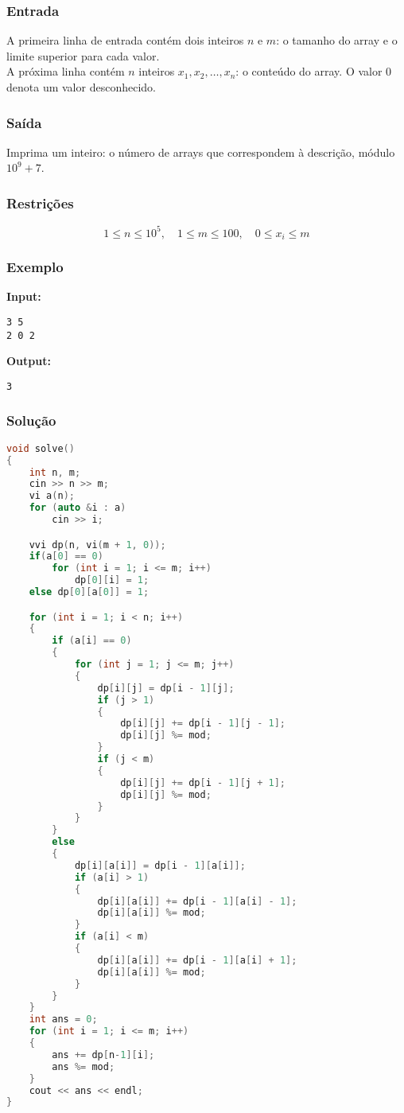 \subsubsection*{Entrada}
A primeira linha de entrada contém dois inteiros \( n \) e \( m \): o tamanho do array e o limite superior para cada valor.\\
A próxima linha contém \( n \) inteiros \( x_1, x_2, \dots, x_n \): o conteúdo do array. O valor \( 0 \) denota um valor desconhecido.

\subsubsection*{Saída}
Imprima um inteiro: o número de arrays que correspondem à descrição, módulo \( 10^9+7 \).

\subsubsection*{Restrições}
\[
1 \le n \le 10^5,\quad 1 \le m \le 100,\quad 0 \le x_i \le m
\]

\subsubsection*{Exemplo}

\textbf{Input:}
\begin{verbatim}
3 5
2 0 2
\end{verbatim}

\textbf{Output:}
\begin{verbatim}
3
\end{verbatim}

\subsubsection*{Solução}
\begin{lstlisting}[language=C++]
void solve()
{
    int n, m;
    cin >> n >> m;
    vi a(n);
    for (auto &i : a)
        cin >> i;

    vvi dp(n, vi(m + 1, 0));
    if(a[0] == 0)
        for (int i = 1; i <= m; i++)
            dp[0][i] = 1;
    else dp[0][a[0]] = 1;

    for (int i = 1; i < n; i++)
    {
        if (a[i] == 0)
        {
            for (int j = 1; j <= m; j++)
            {
                dp[i][j] = dp[i - 1][j];
                if (j > 1)
                {
                    dp[i][j] += dp[i - 1][j - 1];
                    dp[i][j] %= mod;
                }
                if (j < m)
                {
                    dp[i][j] += dp[i - 1][j + 1];
                    dp[i][j] %= mod;
                }
            }
        }
        else
        {
            dp[i][a[i]] = dp[i - 1][a[i]];
            if (a[i] > 1)
            {
                dp[i][a[i]] += dp[i - 1][a[i] - 1];
                dp[i][a[i]] %= mod;
            }
            if (a[i] < m)
            {
                dp[i][a[i]] += dp[i - 1][a[i] + 1];
                dp[i][a[i]] %= mod;
            }
        }
    }
    int ans = 0;
    for (int i = 1; i <= m; i++)
    {
        ans += dp[n-1][i];
        ans %= mod;
    }
    cout << ans << endl;
}
\end{lstlisting}
